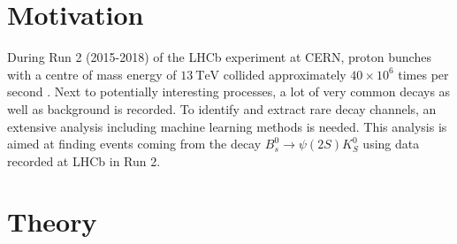 \section{Motivation}

During Run 2 (2015-2018) of the LHCb experiment at CERN, proton bunches with a centre of mass energy of $\qty{13}{\tera\electronvolt}$ collided approximately $40 \times 10^6$ times per second \cite{LHCb_MVA}.
Next to potentially interesting processes, a lot of very common decays as well as background is recorded. To identify and extract rare decay channels, an extensive analysis including machine learning methods is needed.
This analysis is aimed at finding events coming from the decay $B_s^0 \to \psi (2S)K_S^0$ using data recorded at LHCb in Run 2. 

\section{Theory}
\label{sec:Theorie}

